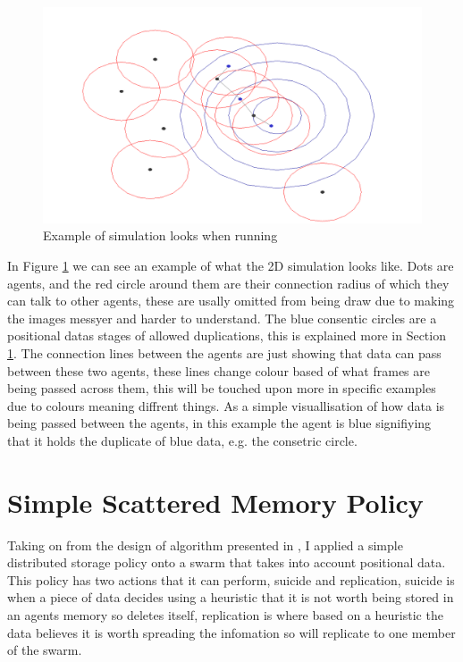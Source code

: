 \documentclass{UoYCSproject}
\begin{document}
\begin{figure}[htb]
\label{fig:Connarea}
\begin{center}
\centering
\includegraphics[width=\linewidth]{"./ExplanationImgs/Connarea.png"}
\caption{Example of simulation looks when running}
\end{center}
\end{figure}

In Figure \ref{fig:Connarea} we can see an example of what the 2D simulation looks like.
Dots are agents, and the red circle around them are their connection radius of which they can talk to other agents, these are usally omitted from being draw due to making the images messyer and harder to understand.
The blue consentic circles are a positional datas stages of allowed duplications, this is explained more in Section \ref{sec:Simple1}.
The connection lines between the agents are just showing that data can pass between these two agents, these lines change colour based of what frames are being passed across them, this will be touched upon more in specific examples due to colours meaning diffrent things.
As a simple visuallisation of how data is being passed between the agents, in this example the agent is blue signifiying that it holds the duplicate of blue data, e.g. the consetric circle.



\section{Simple Scattered Memory Policy}
\label{sec:Simple1}

Taking on from the design of algorithm presented in \cite{Distributed Storage}, I applied a simple distributed storage policy onto a swarm that takes into account positional data.
This policy has two actions that it can perform, suicide and replication, suicide is when a piece of data decides using a heuristic that it is not worth being stored in an agents memory so deletes itself, replication is where based on a heuristic the data believes it is worth spreading the infomation so will replicate to one member of the swarm.
\end{document}
